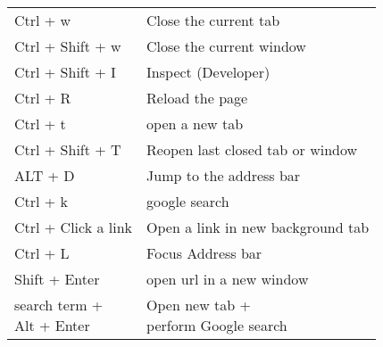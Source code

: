 \documentclass{article}
\begin{document}
\begin{landscape}
\begin{multicols*}{3}
\begin{tabular}{m{3cm}m{5cm}}
            \rowcolor{LightCyan}
            Ctrl + w            & Close the current tab             \\
            Ctrl + Shift + w    & Close the current window          \\
            \rowcolor{LightCyan}
            Ctrl + Shift + I    & Inspect (Developer)               \\
            Ctrl + R            & Reload the page                   \\
            \rowcolor{LightCyan}
            Ctrl + t            & open a new tab                    \\
            Ctrl + Shift + T    & Reopen last closed tab or window  \\
            \rowcolor{LightCyan}
            ALT + D             & Jump to the address bar           \\
            Ctrl + k            & google search                     \\
            \rowcolor{LightCyan}
            Ctrl + Click a link & Open a link in new background tab \\
            Ctrl + L            & Focus Address bar                 \\
            \rowcolor{LightCyan}
            Shift + Enter       & open url in a new window          \\
            \makecell{search term +                                 \\ Alt + Enter} & \makecell{Open new tab + \\perform Google search}
        \end{tabular}
    \end{multicols*}
\end{landscape}
\end{document}

